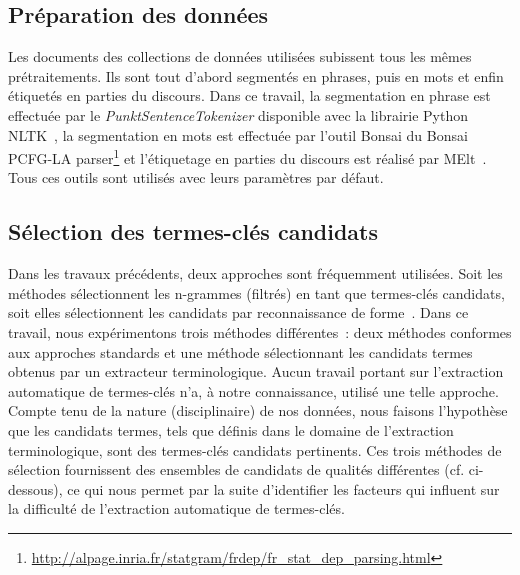   \subsection{Préparation des données}
  \label{subsec:preparation_des_donnees}
    Les documents des collections de données utilisées subissent tous les mêmes
    prétraitements. Ils sont tout d'abord segmentés en phrases, puis en mots et
    enfin étiquetés en parties du discours. Dans ce travail, la segmentation en
    phrase est effectuée par le \textit{PunktSentenceTokenizer} disponible avec
    la librairie Python NLTK~\cite[\textit{Natural Language
    ToolKit}]{bird2009nltk}, la segmentation en mots est effectuée par l'outil
    Bonsai du Bonsai PCFG-LA
    parser\footnote{\url{http://alpage.inria.fr/statgram/frdep/fr_stat_dep_parsing.html}}
    et l'étiquetage en parties du discours est réalisé par
    MElt~\cite{denis2009melt}. Tous ces outils sont utilisés avec leurs
    paramètres par défaut.

  \subsection{Sélection des termes-clés candidats}
  \label{subsec:extraction_de_termes_cles_candidats}
    Dans les travaux précédents, deux approches sont fréquemment utilisées. Soit
    les méthodes sélectionnent les n-grammes (filtrés) en tant que termes-clés
    candidats, soit elles sélectionnent les candidats par reconnaissance de
    forme~\cite{hulth2003keywordextraction}. Dans ce travail, nous expérimentons
    trois méthodes différentes~: deux méthodes conformes aux approches standards
    et une méthode sélectionnant les candidats termes obtenus par un extracteur
    terminologique. Aucun travail portant sur l'extraction automatique de
    termes-clés n'a, à notre connaissance, utilisé une telle approche. Compte
    tenu de la nature (disciplinaire) de nos données, nous faisons l'hypothèse
    que les candidats termes, tels que définis dans le domaine de l'extraction
    terminologique, sont des termes-clés candidats pertinents. Ces trois
    méthodes de sélection fournissent des ensembles de candidats de qualités
    différentes (cf. ci-dessous), ce qui nous permet par la suite d'identifier
    les facteurs qui influent sur la difficulté de l'extraction automatique de
    termes-clés.

